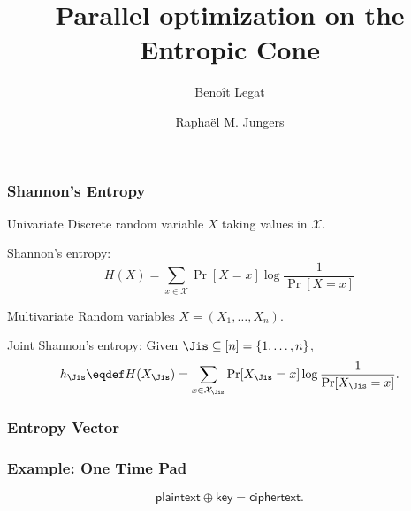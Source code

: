 \documentclass[10pt,svgnames,usenames,table]{beamer}
\title{Parallel optimization on the Entropic Cone}
\date{}
\author{Beno\^it Legat \and Rapha\"el M. Jungers}
\institute{Universit\'e catholique de Louvain (UCL)}
\begin{document}
  \maketitle

  \begin{frame}
    \frametitle{Shannon's Entropy}
    \begin{block}{Univariate}
      Discrete random variable $X$ taking values
      in $\mathcal{X}$.

      Shannon's entropy:
      \[ H(X) = \sum_{x \in \mathcal{X}} \Pr[X = x] \log\frac{1}{\Pr[X = x]} \]
    \end{block}
    \begin{block}{Multivariate}
      Random variables $X = (X_1, \ldots, X_n)$.

      Joint Shannon's entropy: Given $\Jis \subseteq [n] = \{1, \ldots, n\}$,
      \[ h_{\Jis} \eqdef H(X_\Jis) = \sum_{x \in \mathcal{X}_\Jis} \Pr[X_\Jis = x] \log \frac{1}{\Pr[X_\Jis = x]}. \]
    \end{block}
  \end{frame}

  \begin{frame}
    \frametitle{Entropy Vector}
  \end{frame}

  \begin{frame}
    \frametitle{Example: One Time Pad}
    \[ \mathsf{plaintext} \oplus \mathsf{key} = \mathsf{ciphertext}. \]
  \end{frame}
\end{document}
